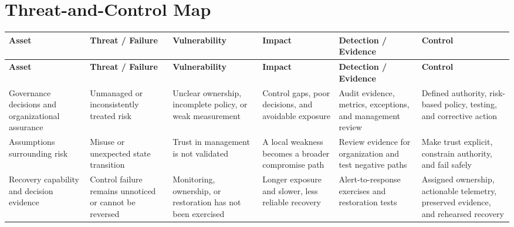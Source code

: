 \documentclass[11pt,letterpaper]{article}
\begin{document}
\section*{Threat-and-Control Map}
\begingroup\scriptsize\setlength{\tabcolsep}{2pt}
\begin{longtable}{>{\raggedright\arraybackslash}p{}>{\raggedright\arraybackslash}p{}>{\raggedright\arraybackslash}p{}>{\raggedright\arraybackslash}p{}>{\raggedright\arraybackslash}p{}>{\raggedright\arraybackslash}p{}}
\toprule\rowcolor{Navy}\color{white}\textbf{Asset} & \color{white}\textbf{Threat / Failure} & \color{white}\textbf{Vulnerability} & \color{white}\textbf{Impact} & \color{white}\textbf{Detection / Evidence} & \color{white}\textbf{Control}\\\midrule
\endfirsthead
\toprule\rowcolor{Navy}\color{white}\textbf{Asset} & \color{white}\textbf{Threat / Failure} & \color{white}\textbf{Vulnerability} & \color{white}\textbf{Impact} & \color{white}\textbf{Detection / Evidence} & \color{white}\textbf{Control}\\\midrule
\endhead
Governance decisions and organizational assurance & Unmanaged or inconsistently treated risk & Unclear ownership, incomplete policy, or weak measurement & Control gaps, poor decisions, and avoidable exposure & Audit evidence, metrics, exceptions, and management review & Defined authority, risk-based policy, testing, and corrective action\\\midrule
Assumptions surrounding risk & Misuse or unexpected state transition & Trust in management is not validated & A local weakness becomes a broader compromise path & Review evidence for organization and test negative paths & Make trust explicit, constrain authority, and fail safely\\\midrule
Recovery capability and decision evidence & Control failure remains unnoticed or cannot be reversed & Monitoring, ownership, or restoration has not been exercised & Longer exposure and slower, less reliable recovery & Alert-to-response exercises and restoration tests & Assigned ownership, actionable telemetry, preserved evidence, and rehearsed recovery\\\midrule
\bottomrule
\end{longtable}
\endgroup
\end{document}
